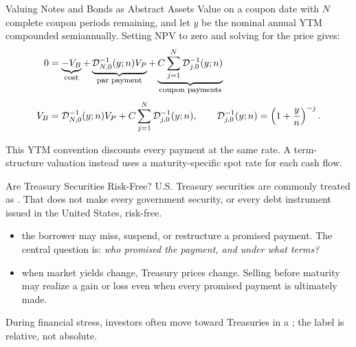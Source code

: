\documentclass[aspectratio=169,11pt]{beamer}
\begin{document}
\begin{frame}{Valuing Notes and Bonds as Abstract Assets}
  Value on a coupon date with $N$ complete coupon periods remaining, and let $y$
  be the nominal annual YTM compounded semiannually. Setting NPV to zero and
  solving for the price gives:
  \begin{align*}
    0 &= \underbrace{-V_B}_{\text{\footnotesize cost}}
       + \underbrace{\mathcal D_{N,0}^{-1}(y;n)V_P}_{\text{\footnotesize par payment}}
       + \underbrace{C\sum_{j=1}^{N}\mathcal D_{j,0}^{-1}(y;n)}_{\text{\footnotesize coupon payments}}\\[0.3em]
    V_B &= \mathcal D_{N,0}^{-1}(y;n)V_P+C\sum_{j=1}^{N}\mathcal D_{j,0}^{-1}(y;n),
    \qquad \mathcal D_{j,0}^{-1}(y;n)=\left(1+\frac{y}{n}\right)^{-j}.
  \end{align*}

  \vspace{0.2em}
  This YTM convention discounts every payment at the same rate. A term-structure
  valuation instead uses a maturity-specific spot rate for each cash flow.
\end{frame}

\begin{frame}{Are Treasury Securities Risk-Free?}
  \vspace{0.3em}
  U.S. Treasury securities are commonly treated as . That does not make every government security, or
  every debt instrument issued in the United States, risk-free.

  \vspace{0.65em}
  \begin{itemize}\setlength{\itemsep}{0.55em}
    \item \textbf{} the borrower may miss, suspend, or
      restructure a promised payment. The central question is: \emph{who promised
      the payment, and under what terms?}
    \item \textbf{} when market yields change, Treasury
      prices change. Selling before maturity may realize a gain or loss even when
      every promised payment is ultimately made.
  \end{itemize}

  \vspace{0.4em}
  During financial stress, investors often move toward Treasuries in a
  ; the label is relative, not absolute.
\end{frame}
\end{document}
